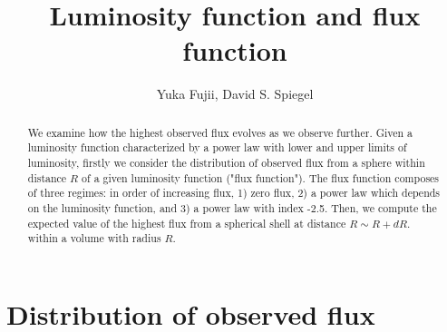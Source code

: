 \documentclass[iop,numberedappendix,apj,twocolappendix,]{emulateapj}
\begin{document}
\renewcommand\bottomfraction{.9}
\newcommand{\PD}[2]{\frac{\partial {#1}}{\partial {#2}}}
\newcommand{\memoYF}[1]{\color{red} #1 \color{black}}

\title{Luminosity function and flux function}
\author{%
Yuka Fujii, %
David S. Spiegel%
}


  




\begin{abstract}
We examine how the highest observed flux evolves as we observe further. 
Given a luminosity function characterized by a power law with lower and upper limits of luminosity, firstly we consider the distribution of observed flux from a sphere within distance $R$ of a given luminosity function ("flux function"). The flux function composes of three regimes: in order of increasing flux, 1) zero flux, 2) a power law which depends on the luminosity function, and 3) a power law with index -2.5. 
Then, we compute the expected value of the highest flux from a spherical shell at distance $R\sim R+dR$. within a volume with radius $R$. 
\end{abstract} 


\section{Distribution of observed flux} 
\label{sec:luminosity function}
\end{document}
